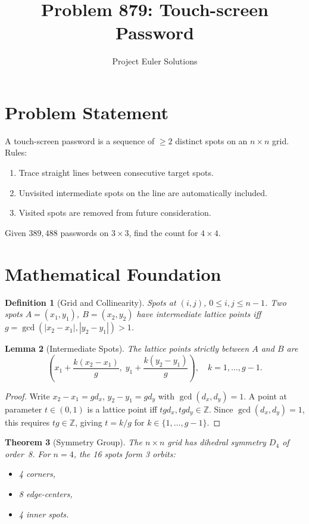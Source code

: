 \documentclass[11pt]{article}
\title{Problem 879: Touch-screen Password}
\author{Project Euler Solutions}
\date{}
\newtheorem{theorem}{Theorem}
\newtheorem{lemma}[theorem]{Lemma}
\newtheorem{definition}[theorem]{Definition}
\begin{document}
\maketitle

\section{Problem Statement}

A touch-screen password is a sequence of $\ge 2$ distinct spots on an $n \times n$ grid. Rules:
\begin{enumerate}
\item Trace straight lines between consecutive target spots.
\item Unvisited intermediate spots on the line are automatically included.
\item Visited spots are removed from future consideration.
\end{enumerate}
Given $389{,}488$ passwords on $3 \times 3$, find the count for $4 \times 4$.

\section{Mathematical Foundation}

\begin{definition}[Grid and Collinearity]
Spots at $(i,j)$, $0 \le i,j \le n-1$. Two spots $A=(x_1,y_1)$, $B=(x_2,y_2)$ have intermediate lattice points iff $g = \gcd(|x_2-x_1|,|y_2-y_1|) > 1$.
\end{definition}

\begin{lemma}[Intermediate Spots]
The lattice points strictly between $A$ and $B$ are
\[
\left(x_1 + \frac{k(x_2-x_1)}{g},\; y_1 + \frac{k(y_2-y_1)}{g}\right), \quad k = 1, \ldots, g-1.
\]
\end{lemma}

\begin{proof}
Write $x_2-x_1 = gd_x$, $y_2-y_1 = gd_y$ with $\gcd(d_x,d_y)=1$. A point at parameter $t \in (0,1)$ is a lattice point iff $tgd_x, tgd_y \in \mathbb{Z}$. Since $\gcd(d_x,d_y)=1$, this requires $tg \in \mathbb{Z}$, giving $t = k/g$ for $k \in \{1,\ldots,g-1\}$.
\end{proof}

\begin{theorem}[Symmetry Group]
The $n \times n$ grid has dihedral symmetry $D_4$ of order~8. For $n=4$, the 16 spots form 3 orbits:
\begin{itemize}
\item 4 corners,
\item 8 edge-centers,
\item 4 inner spots.
\end{itemize}
\end{theorem}
\end{document}
